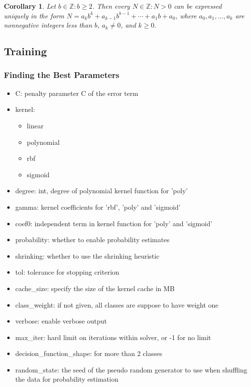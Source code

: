 \documentclass[12pt, titlepage]{amsart}
\newcommand\Z{{\mathbb Z}}
\newtheorem{cor}{Corollary}[subsection]
\theoremstyle{definition}
\begin{document}
	\begin{cor}
		Let $b \in \Z : b \geq 2$. Then every $N \in \Z : N > 0$ can be expressed uniquely in the form $N = a_kb^k + a_{k-1}b^{b-1} + \cdots + a_1 b + a_0$, where $a_0, a_1, \ldots, a_k$ are nonnegative integers less than $b$, $a_k \neq 0$, and $k \geq 0$. \cite{koshy}
	\end{cor}
	
	
	
	
	\subsection{Training}
		
		\subsubsection{Finding the Best Parameters}
		
		\begin{itemize}
			\item C: penalty parameter C of the error term
			\item kernel: 
			\begin{itemize}
				\item linear
				\item polynomial
				\item rbf
				\item sigmoid
			\end{itemize}
			\item degree: int, degree of polynomial kernel function for 'poly'
			\item gamma: kernel coefficients for 'rbf', 'poly' and 'sigmoid'
			\item coef0: independent term in kernel function for 'poly' and 'sigmoid'
			\item probability: whether to enable probability estimates
			\item shrinking: whether to use the shrinking heuristic
			\item tol: tolerance for stopping criterion
			\item cache\_size: specify the size of the kernel cache in MB
			\item class\_weight: if not given, all classes are suppose to have weight one
			\item verbose: enable verbose output
			\item max\_iter: hard limit on iterations within solver, or -1 for no limit
			\item decision\_function\_shape: for more than 2 classes
			\item random\_state: the seed of the pseudo random generator to use when shuffling the data for probability estimation
		\end{itemize}
	
\end{document}

